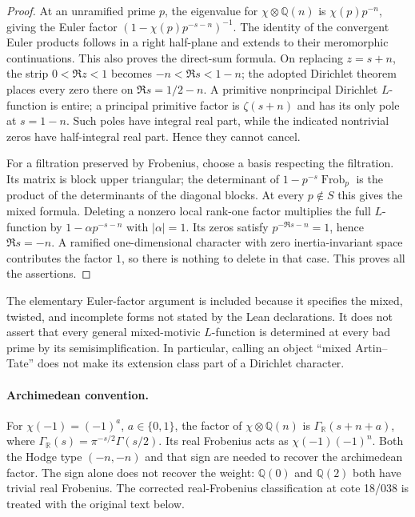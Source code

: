 \begin{proof}
At an unramified prime $p$, the eigenvalue for $\chi\otimes\mathbb Q(n)$
is $\chi(p)p^{-n}$, giving the Euler factor
$(1-\chi(p)p^{-s-n})^{-1}$.  The identity of the convergent Euler
products follows in a right half-plane and extends to their meromorphic
continuations.  This also proves the direct-sum formula.  On replacing
$z=s+n$, the strip $0<\Re z<1$ becomes
$-n<\Re s<1-n$; the adopted Dirichlet theorem places every zero there
on $\Re s=1/2-n$.  A primitive nonprincipal Dirichlet $L$-function is
entire; a principal primitive factor is $\zeta(s+n)$ and has its only
pole at $s=1-n$.  Such poles have integral real part, while the indicated
nontrivial zeros have half-integral real part.  Hence they cannot cancel.

For a filtration preserved by Frobenius, choose a basis respecting the
filtration.  Its matrix is block upper triangular; the determinant of
$1-p^{-s}\operatorname{Frob}_p$ is the product of the determinants of
the diagonal blocks.  At every $p\notin S$ this gives the mixed formula.
Deleting a nonzero local rank-one factor multiplies the full $L$-function
by $1-\alpha p^{-s-n}$ with $|\alpha|=1$.  Its zeros satisfy
$p^{-\Re s-n}=1$, hence $\Re s=-n$.  A ramified one-dimensional
character with zero inertia-invariant space contributes the factor $1$,
so there is nothing to delete in that case.  This proves all the assertions.
\end{proof}

The elementary Euler-factor argument is included because it specifies the
mixed, twisted, and incomplete forms not stated by the Lean declarations.
It does not assert that every general mixed-motivic $L$-function is
determined at every bad prime by its semisimplification.  In particular,
calling an object ``mixed Artin--Tate'' does not make its extension class
part of a Dirichlet character.

\paragraph{Archimedean convention.}
For $\chi(-1)=(-1)^a$, $a\in\{0,1\}$, the factor of
$\chi\otimes\mathbb Q(n)$ is $\Gamma_{\mathbb R}(s+n+a)$, where
$\Gamma_{\mathbb R}(s)=\pi^{-s/2}\Gamma(s/2)$.  Its real Frobenius
acts as $\chi(-1)(-1)^n$.  Both the Hodge type $(-n,-n)$ and that
sign are needed to recover the archimedean factor.  The sign alone does
not recover the weight: $\mathbb Q(0)$ and $\mathbb Q(2)$ both have
trivial real Frobenius.  The corrected real-Frobenius classification at
cote 18/038 is treated with the original text below.

